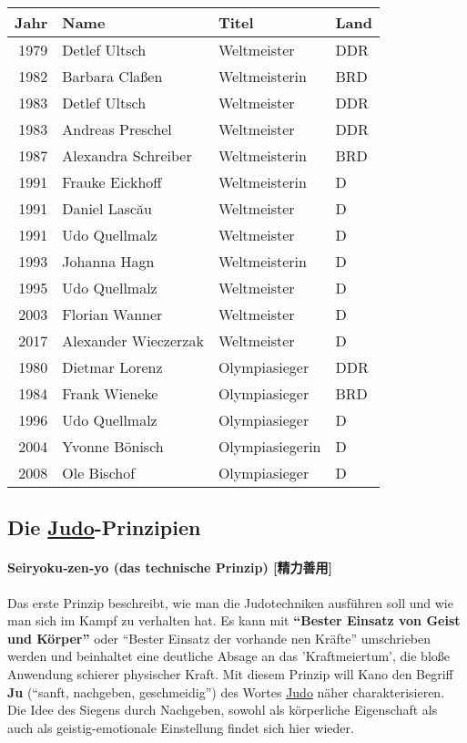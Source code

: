 \documentclass[justified, a4paper, notitlepage, captions=tableheading, nobib]{tufte-handout}
\begin{document}
\begin{center}
\begin{tabular}{rlll}
\hline
Jahr & Name & Titel & Land\\
\hline
1979 & Detlef Ultsch & Weltmeister & DDR\\
1982 & Barbara Claßen & Weltmeisterin & BRD\\
1983 & Detlef Ultsch & Weltmeister & DDR\\
1983 & Andreas Preschel & Weltmeister & DDR\\
1987 & Alexandra Schreiber & Weltmeisterin & BRD\\
1991 & Frauke Eickhoff & Weltmeisterin & D\\
1991 & Daniel Lascău & Weltmeister & D\\
1991 & Udo Quellmalz & Weltmeister & D\\
1993 & Johanna Hagn & Weltmeisterin & D\\
1995 & Udo Quellmalz & Weltmeister & D\\
2003 & Florian Wanner & Weltmeister & D\\
2017 & Alexander Wieczerzak & Weltmeister & D\\
\hline
1980 & Dietmar Lorenz & Olympiasieger & DDR\\
1984 & Frank Wieneke & Olympiasieger & BRD\\
1996 & Udo Quellmalz & Olympiasieger & D\\
2004 & Yvonne Bönisch & Olympiasiegerin & D\\
2008 & Ole Bischof & Olympiasieger & D\\
\hline
\end{tabular}
\end{center}

\subsection{Die \hyperref[org4f88021]{Judo}-Prinzipien}
\label{sec:orgce03c4e}
\paragraph{Seiryoku‐zen‐yo (das technische Prinzip) [精力善用]}
\label{sec:orgc62e47e}
Das erste Prinzip beschreibt, wie man die Judotechniken ausführen soll und wie man sich im Kampf zu verhalten hat. Es kann mit \textbf{"`Bester Einsatz von Geist und Körper"'} oder "`Bester Einsatz der vorhande
nen Kräfte"' umschrieben werden und beinhaltet eine deutliche Absage an das 'Kraftmeiertum', die bloße Anwendung schierer physischer Kraft. Mit diesem Prinzip will Kano den Begriff \textbf{Ju} ("`sanft, nachgeben, geschmeidig"') des Wortes \hyperref[org4f88021]{Judo} näher charakterisieren. Die Idee des Siegens durch Nachgeben, sowohl als körperliche Eigenschaft als auch als geistig-emotionale Einstellung findet sich hier wieder. 
\end{document}

